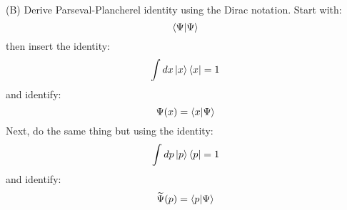 \documentclass[12pt]{article}
\begin{document}
\noindent
(B) Derive Parseval-Plancherel identity using the Dirac notation.  Start with:
$$\braket{\Psi|\Psi}$$
then insert the identity:
$$\int dx \ket{x}\bra{x} = 1$$
and identify:
$$\Psi(x) = \braket{x|\Psi}$$
Next, do the same thing but using the identity:
$$\int dp \ket{p}\bra{p} = 1$$
and identify:
$$\widetilde{\Psi}(p) = \braket{p|\Psi}$$
\end{document}
